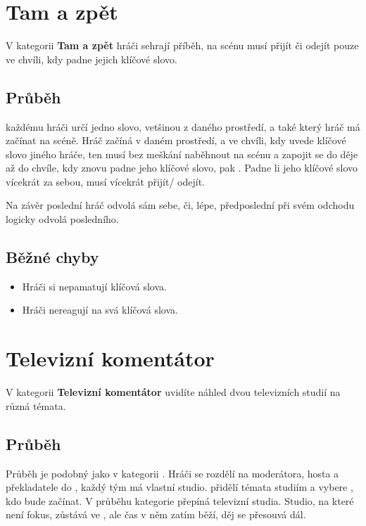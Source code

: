  
 
 
\needspace{5cm} \section{Tam a zpět} \label{tam a zpět}  
 
 
V kategorii \textbf{Tam a zpět}{} hráči sehrají příběh, na scénu musí přijít či odejít pouze ve chvíli, kdy padne jejich klíčové slovo. 
 
 
\subsection{Průběh}  každému hráči určí jedno slovo, vetšinou z daného prostředí, a také který hráč má začínat na scéně. 
Hráč začíná v daném prostředí, a ve chvíli, kdy uvede klíčové slovo jiného hráče, ten musí bez meškání naběhnout na scénu a zapojit se do děje až do chvíle, kdy znovu padne jeho klíčové slovo, pak . Padne li jeho klíčové slovo vícekrát za sebou, musí vícekrát přijít/ odejít. 
 
Na závěr poslední hráč odvolá sám sebe, či, lépe, předposlední při svém odchodu logicky odvolá posledního. 
 
\subsection{ Běžné chyby } \begin{itemize}
\item Hráči si nepamatují klíčová slova.
\item Hráči nereagují na svá klíčová slova.
\end{itemize}
 
 
 
 
 
\needspace{5cm} \section{Televizní komentátor} \label{televizní komentátor}  
 
V kategorii \textbf{Televizní komentátor}{} uvidíte náhled dvou televizních studií na různá témata. 
 
\subsection{ Průběh } Průběh je podobný jako v kategorii . Hráči se rozdělí na moderátora, hosta a překladatele do , každý tým má vlastní studio.  přidělí témata studiím a vybere , kdo bude začínat. V průběhu kategorie  přepíná televizní studia. 
Studio, na které není fokus, zůstává ve , ale čas v něm zatím běží, děj se přesouvá dál. 
 
